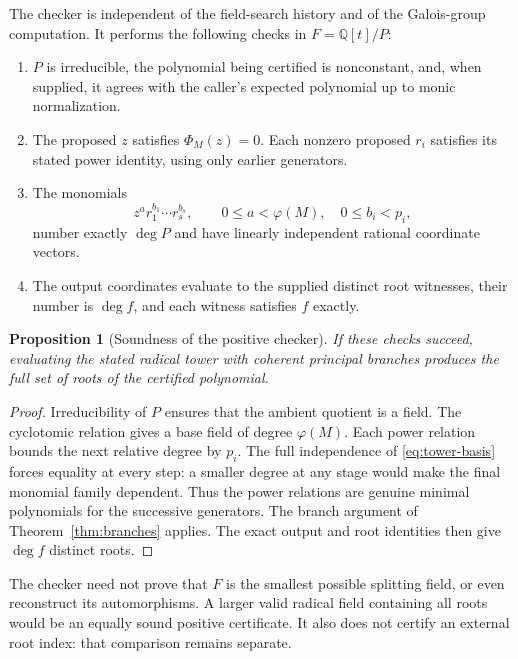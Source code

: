 \documentclass[11pt,a4paper]{article}
\newtheorem{proposition}[theorem]{Proposition}
\theoremstyle{definition}
\theoremstyle{remark}
\newcommand{\Q}{\mathbb Q}
\begin{document}
The checker is independent of the field-search history and of the Galois-group
computation. It performs the following checks in $F=\Q[t]/P$:
\begin{enumerate}
\item $P$ is irreducible, the polynomial being certified is nonconstant, and,
      when supplied, it agrees with the caller's expected polynomial up to
      monic normalization.
\item The proposed $z$ satisfies $\Phi_M(z)=0$. Each nonzero proposed $r_i$
      satisfies its stated power identity, using only earlier generators.
\item The monomials
\begin{equation}\label{eq:tower-basis}
 z^a r_1^{b_1}\cdots r_s^{b_s},\qquad
 0\leq a<\varphi(M),\quad 0\leq b_i<p_i,
\end{equation}
      number exactly $\deg P$ and have linearly independent rational coordinate
      vectors.
\item The output coordinates evaluate to the supplied distinct root witnesses,
      their number is $\deg f$, and each witness satisfies $f$ exactly.
\end{enumerate}

\begin{proposition}[Soundness of the positive checker]\label{prop:certificate}
If these checks succeed, evaluating the stated radical tower with coherent
principal branches produces the full set of roots of the certified polynomial.
\end{proposition}
\begin{proof}
Irreducibility of $P$ ensures that the ambient quotient is a field. The
cyclotomic relation gives a base field of degree $\varphi(M)$. Each power
relation bounds the next relative degree by $p_i$. The full independence of
\eqref{eq:tower-basis} forces equality at every step: a smaller degree at any
stage would make the final monomial family dependent. Thus the power relations
are genuine minimal polynomials for the successive generators. The branch
argument of Theorem~\ref{thm:branches} applies. The exact output and root
identities then give $\deg f$ distinct roots.
\end{proof}

The checker need not prove that $F$ is the smallest possible splitting field,
or even reconstruct its automorphisms. A larger valid radical field containing
all roots would be an equally sound positive certificate. It also does not
certify an external root index: that comparison remains separate.
\end{document}
